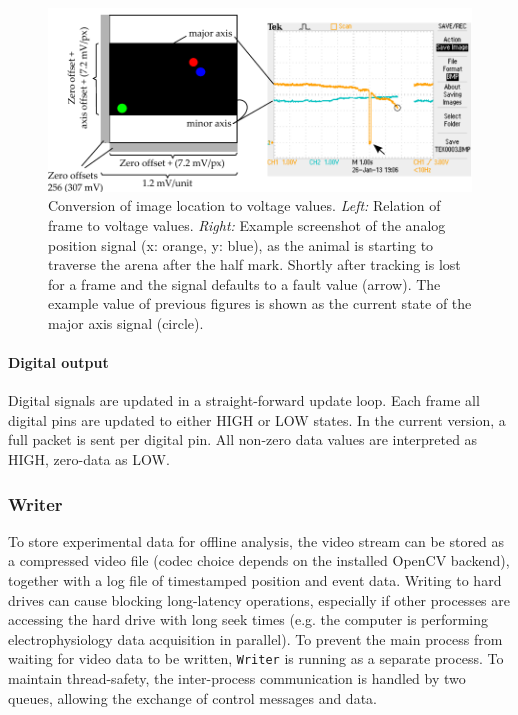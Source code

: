 \begin{figure}%
	\centering
		\includegraphics [width=\linewidth]{gfx/DAC_ranges.pdf} %
	\caption[Test]{Conversion of image location to voltage values. \emph{Left:} Relation of frame to voltage values. \emph{Right:} Example screenshot of the analog position signal (x: orange, y: blue), as the animal is starting to traverse the arena after the half mark. Shortly after tracking is lost for a frame and the signal defaults to a fault value (arrow). The example value of previous figures is shown as the current state of the major axis signal (circle).}
	\label{fig:DAC}
\end{figure}

\paragraph{Digital output}
\label{sec:DigitalOutput}

Digital signals are updated in a straight-forward update loop. Each frame all digital pins are updated to either HIGH or LOW states. In the current version, a full packet is sent per digital pin. All non-zero data values are interpreted as HIGH, zero-data as LOW.

\subsubsection{Writer}
\label{sec:Writer}
To store experimental data for offline analysis, the video stream can be stored as a compressed video file (codec choice depends on the installed OpenCV backend), together with a log file of timestamped position and event data. Writing to hard drives can cause blocking long-latency operations, especially if other processes are accessing the hard drive with long seek times (e.g. the computer is performing electrophysiology data acquisition in parallel). To prevent the main process from waiting for video data to be written, \texttt{Writer} is running as a separate process. To maintain thread-safety, the inter-process communication is handled by two queues, allowing the exchange of control messages and data.

